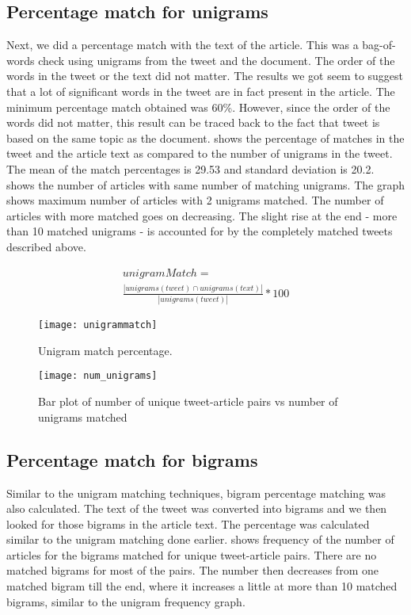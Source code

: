 \subsection{Percentage match for unigrams}

Next, we did a percentage match with the text of the article. This was a bag-of-words check using unigrams from the tweet and the document. The order of the words in the tweet or the text did not matter. The results we got seem to suggest that a lot of significant words in the tweet are in fact present in the article. The minimum percentage match obtained was 60\%. However, since the order of the words did not matter, this result can  be traced back to the fact that tweet is based on the same topic as the document.  shows the percentage of matches in the tweet and the article text as compared to the number of unigrams in the tweet. The mean of the match percentages is 29.53 and standard deviation is 20.2.  shows the number of articles with same number of matching unigrams. The graph shows maximum number of articles with 2 unigrams matched. The number of articles with more matched goes on decreasing. The slight rise at the end - more than 10 matched unigrams - is accounted for by the completely matched tweets described above.

\begin{multline}
unigramMatch = \\ \frac{| unigrams(tweet) \cap unigrams(text) |}{| unigrams(tweet) |} * 100
\end{multline}

\begin{figure}[htbp]
\centering
\texttt{[image: unigrammatch]}
\caption{Unigram match percentage.}
\label{fig:unigrammatch}
\end{figure}

\begin{figure}[htbp]
\centering
\texttt{[image: num\_unigrams]}
\caption{Bar plot of number of unique tweet-article pairs vs number of unigrams matched}
\label{fig:num_unigrams}
\end{figure}

\subsection{Percentage match for bigrams}

Similar to the unigram matching techniques, bigram percentage matching was also calculated. The text of the tweet was converted into bigrams and we then looked for those bigrams in the article text. The percentage was calculated similar to the unigram matching done earlier.  shows frequency of the number of articles for the bigrams matched for unique tweet-article pairs. There are no matched bigrams for most of the pairs. The number then decreases from one matched bigram till the end, where it increases a little at more than 10 matched bigrams, similar to the unigram frequency graph.

